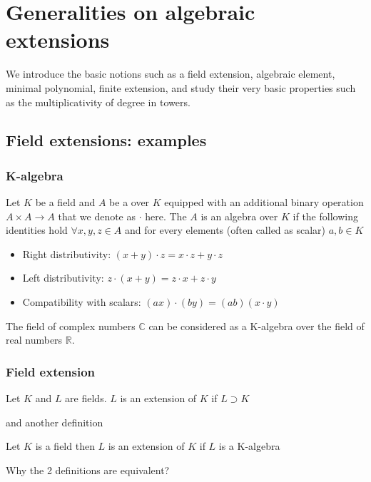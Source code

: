 \chapter{Generalities on algebraic extensions}
We introduce the basic notions such as a field extension, algebraic
element, minimal polynomial, finite extension, and study their very
basic properties such as the multiplicativity of degree in towers. 

\section{Field extensions: examples}

\subsection{K-algebra}
\begin{definition}[K-algebra]
  Let $K$ be a field and $A$ be a  over $K$
  equipped with 
  an additional binary operation $A \times A \rightarrow A$ that we
  denote as $\cdot$ here. The $A$ is an algebra over $K$ if the
  following identities hold $\forall x,y,z \in A$ and for every
  elements (often called as scalar) $a, b \in K$
  \begin{itemize}
  \item Right distributivity:
    $(x + y) \cdot z = x \cdot z + y \cdot z$
  \item Left distributivity:
    $z \cdot (x + y) = z \cdot x + z \cdot y$
  \item Compatibility with scalars:
    $(ax) \cdot (by) = (ab) (x \cdot y)$
  \end{itemize}
  \label{def:kalgebra}
\end{definition}

\begin{example}
  The field of complex numbers $\mathbb{C}$ can be considered as a
  K-algebra over the field of real numbers $\mathbb{R}$.
  \label{ex:complexnumbers}
\end{example}

\subsection{Field extension}

\begin{definition}
  Let $K$ and $L$ are fields.
  $L$ is an extension of $K$ if $L \supset K$
  \label{def:fextension1}
\end{definition}
and another definition
\begin{definition}
  Let $K$ is a field then
  $L$ is an extension of $K$ if $L$ is a K-algebra
  \label{def:fextension2}
\end{definition}
Why the 2 definitions are equivalent?

